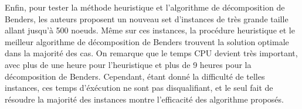 Enfin, pour tester la méthode heuristique et l'algorithme de décomposition de Benders, les auteurs proposent un nouveau set d'instances de très grande taille allant jusqu'à 500 noeuds. Même sur ces instances, la procédure heuristique et le meilleur algorithme de décomposition de Benders trouvent la solution optimale dans la majorité des cas. On remarque que le temps CPU devient très important, avec plus de une heure pour l'heuristique et plus de 9 heures pour la décomposition de Benders. Cependant, étant donné la difficulté de telles instances, ces temps d'éxécution ne sont pas disqualifiant, et le seul fait de résoudre la majorité des instances montre l'efficacité des algorithme proposés.
